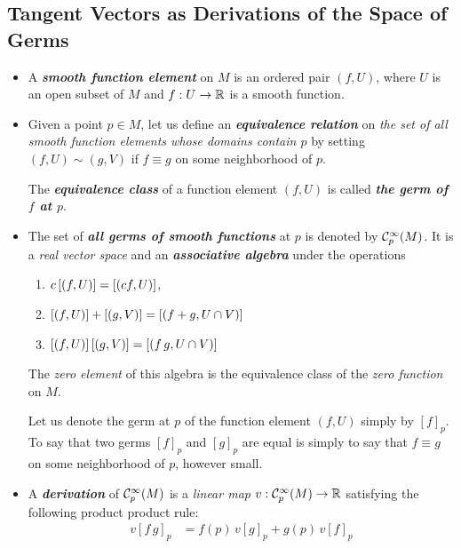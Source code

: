 \documentclass[11pt]{article}
\begin{document}
\subsection{Tangent Vectors as Derivations of the Space of Germs}
\begin{itemize}
\item \begin{definition}
A \emph{\textbf{smooth function element}} on $M$ is an ordered pair $(f, U)$, where $U$ is an open subset of $M$ and $f: U \rightarrow {\mathbb R}$ is a smooth function.
\end{definition}

\item \begin{definition}
Given a point $p \in M$, let us define an \textbf{\emph{equivalence relation}} on \emph{the set of all smooth function elements whose domains contain $p$} by setting $(f, U) \sim (g, V)$ if $f \equiv g$ on some neighborhood of $p$.

The \textbf{\emph{equivalence class}} of a function element $(f, U)$ is called \textbf{\emph{the germ of $f$ at $p$}}.
\end{definition}

\item \begin{definition}
The set of \emph{\textbf{all germs of smooth functions}} at $p$ is denoted by ${\mathcal C}_{p}^{\infty}(M)$. It is a \emph{real vector space} and an \emph{\textbf{associative algebra}} under the operations
\begin{enumerate}
\item $c\left[(f, U)\right] = \left[(cf, U)\right]$,
\item $\left[(f, U)\right] + \left[(g, V)\right] = \left[(f+g, U\cap V)\right]$
\item $\left[(f, U)\right]\left[(g, V)\right] = \left[(f\,g, U\cap V)\right]$
\end{enumerate}
The \emph{zero element} of this algebra is the equivalence class of the \emph{zero function} on $M$.
\end{definition}

Let us denote the germ at $p$ of the function element $(f, U)$ simply by $[f]_p$. To say that two germs $[f]_{p}$ and $[g]_p$ are equal is simply to say that $f \equiv g$ on some neighborhood of $p$, however small. 

\item \begin{definition}
A \emph{\textbf{derivation}} of ${\mathcal C}_{p}^{\infty}(M)$ is a \emph{linear map} $v: {\mathcal C}_{p}^{\infty}(M) \rightarrow {\mathbb R}$ satisfying the following product product rule:
\begin{align*}
v[f\,g]_{p} &= f(p)\,v[g]_{p} + g(p)\,v[f]_{p}
\end{align*}
\end{definition}


\end{itemize}
\end{document}
